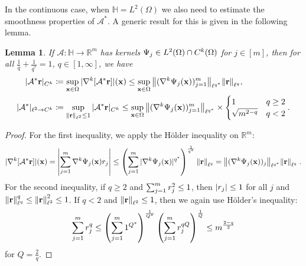 \documentclass[10pt,a4paper,onecolumn]{article}
\numberwithin{equation}{section}
\newtheorem{lemma}{Lemma}[section]\newtheorem{example}{Example}[section]
\let\F\mathds\let\C\mathcal\newcommand{\R}{\F{R}}\newcommand{\A}{\C{A}}
\newcommand{\norm}[1]{{\left\lVert #1 \right\rVert}}
\newcommand{\splitln}[4]{\begin{cases} #1 & #2 \\ #3 & #4\end{cases}}
\renewcommand{\vec}{\mathbf}
\newcommand{\UCmath}[1]{%
	\begingroup
	\ucmathlist\uppercase\expandafter{#1}%
	\endgroup
}
\newcommand{\ucmathlist}{%
	\def\alpha{\mathrm{A}}%
	\def\beta{\mathrm{B}}%
	\let\gamma=\Gamma
	\let\delta=\Delta
	\def\epsilon{\mathrm{E}}%
	\def\varepsilon{\mathrm{E}}%
	\def\zeta{\mathrm{Z}}%
	\def\eta{\mathrm{H}}%
	\let\theta=\Theta
	\let\vartheta=\Theta
	\def\iota{\mathrm{I}}%
	\def\kappa{\mathrm{K}}%
	\let\lambda=\Lambda
	\def\mu{\mathrm{M}}%
	\def\nu{\mathrm{N}}%
	\let\xi=\Xi
	\let\pi=\Pi
	\let\varpi=\Pi
	\def\rho{\mathrm{P}}%
	\def\varrho{\mathrm{P}}%
	\let\sigma=\Sigma
	\def\tau{\mathrm{T}}%
	\let\upsilon=\Upsilon
	\let\phi=\Phi
	\let\varphi=\Phi
	\def\chi{\mathrm{X}}%
	\let\psi=\Psi
	\let\omega=\Omega
}
\newcommand{\caps}[1]{\UCmath{#1}}
\newcommand*{\vard}[1]{%
	\IfEqCase{#1}{%
		{0}{\varphi}%
		{1}{\psi}%
	}[\varphi #1]%
}
\newcommand*{\varx}[1]{%
	\IfEqCase{#1}{%
		{0}{x}%
		{1}{y}%
		{2}{z}%
		{3}{r}%
	}[x#1]%
}
\newcommand{\Domain}{\Omega}
\newcommand*{\Varx}[1]{\caps{\varx{#1}}}
\newcommand*{\vvarx}[1]{\vec{\varx{#1}}}\newcommand*{\vVarx}[1]{\vec{\Varx{#1}}}
\begin{document}
In the continuous case, when $\F H=L^2(\Domain)$ we also need to estimate the smoothness properties of $\A^*$. A generic result for this is given in the following lemma.
\begin{lemma}\label{thm: norm bound smoothness}
	If $\A\colon \F H \to \R^m$ has kernels $\vard1_j\in L^2(\Domain)\cap C^k(\Domain)$ for $j\in[m]$, then for all $\frac1q+\frac1{q^*}=1$, $q\in[1,\infty]$, we have
	\begin{align}
		|\A^*\vvarx3|_{C^k}&\coloneqq \sup_{\vvarx0\in\Domain} |\nabla^k[\A^*\vvarx3]|(\vvarx0) \leq \sup_{\vvarx0\in\Domain}\norm{(\nabla^k\vard1_j(\vvarx0))_{j=1}^m}_{\ell^{q^*}}\norm{\vvarx3}_{\ell^q},
		\\ |\A^*|_{\ell^2\to C^k}&\coloneqq \sup_{\norm{\vvarx3}_{\ell^2}\leq 1} |\A^*\vvarx3|_{C^k} \leq \sup_{\vvarx0\in\Domain}\norm{(\nabla^k\vard1_j(\vvarx0))_{j=1}^m}_{\ell^{q^*}}\times \splitln{1}{q\geq 2}{\sqrt{m^{2-q}}}{q<2}.
	\end{align}
\end{lemma}
\begin{proof}
	For the first inequality, we apply the H\"older inequality on $\R^m$:
	$$ |\nabla^k[\A^*\vvarx3]|(\vvarx0) = \left|\sum_{j=1}^m\nabla^k\vard1_j(\vvarx0)\varx3_j\right|
	\leq \left(\sum_{j=1}^m|\nabla^k\vard1_j(\vvarx0)|^{q^*}\right)^{\frac{1}{q^*}}\norm{\vvarx3}_{\ell^q} = \norm{(\nabla^k\vard1_j(\vvarx0))_j}_{\ell^{q^*}}\norm{\vvarx3}_{\ell^q}\;.$$
	For the second inequality, if $q\geq2$ and $\sum_{j=1}^m \varx3_j^2\leq 1$, then $|\varx3_j|\leq 1$ for all $j$ and $\norm{\vvarx3}_{\ell^q}^q\leq \norm{\vvarx3}_{\ell^2}^2\leq 1$. If $q<2$ and $\norm{\vvarx3}_{\ell^2}\leq 1$, then we again use H\"older's inequality:
	$$\sum_{j=1}^m \varx3_j^q \leq \left(\sum_{j=1}^m 1^{Q^*}\right)^{\frac1{Q^*}} \left(\sum_{j=1}^m \varx3_j^{qQ}\right)^{\frac1{Q}} \leq m^{\frac{2-q}{2}}$$
	for $Q = \frac2q$.
\end{proof}
\end{document}
